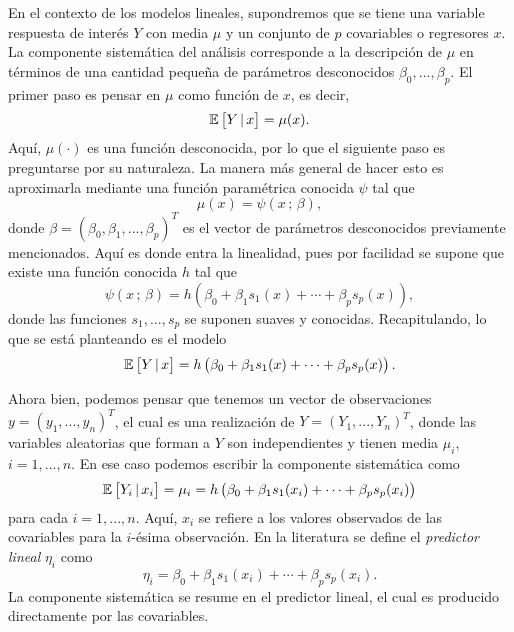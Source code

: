 En el contexto de los modelos lineales, supondremos que se tiene una variable respuesta  de interés $Y$ con media $\mu$ y un conjunto de $p$ covariables o regresores $x$. La componente sistemática del análisis corresponde a la descripción de $\mu$ en términos de una cantidad pequeña de parámetros desconocidos $\beta_0, ..., \beta_p$. El primer paso es pensar en $\mu$ como función de $x$, es decir,
\begin{equation*}
	\mathbb{E} \left[ Y \, | \, x \right] = \mu (x).
\end{equation*}
Aquí, $\mu(\cdot)$ es una función desconocida, por lo que el siguiente paso es preguntarse por su naturaleza. La manera más general de hacer esto es aproximarla mediante una función paramétrica conocida $\psi$ tal que
\begin{equation*}
	\mu (x) = \psi (x \, ; \, \beta),
\end{equation*}
donde $\beta = (\beta_0, \beta_1, ..., \beta_p)^T$ es el vector de parámetros desconocidos previamente mencionados. Aquí es donde entra la linealidad, pues por facilidad se supone que existe una función conocida $h$ tal que
\begin{equation} \label{eq:lm1}
	\psi (x \, ; \, \beta) = h \left(  \beta_0 + \beta_1 s_1(x) + \cdots + \beta_p s_p(x) \right),
\end{equation}
donde las funciones $s_1, ..., s_p$ se suponen suaves y conocidas. Recapitulando, lo que se está planteando es el modelo
\begin{equation} \label{eq:lm2}
	\mathbb{E} \left[ Y \, | \, x \right] = h \left(  \beta_0 + \beta_1 s_1(x) + \cdots + \beta_p s_p(x) \right).
\end{equation}

Ahora bien, podemos pensar que tenemos un vector de observaciones \newline$y = (y_1, ..., y_n)^T$, el cual es una realización de $Y = (Y_1, ..., Y_n)^T$, donde las variables aleatorias que forman a $Y$ son independientes y tienen media $\mu_i$, $i=1,...,n$. En ese caso podemos escribir la componente sistemática como
\begin{equation*}
	\mathbb{E} \left[ Y_i \, | \, x_i \right] = \mu_i = h \left(  \beta_0 + \beta_1 s_1(x_i) + \cdots + \beta_p s_p(x_i) \right)
\end{equation*}
para cada $i=1,...,n$. Aquí, $x_i$ se refiere a los valores observados de las covariables para la $i$-ésima observación. En la literatura se define el \textit{predictor lineal} $\eta_i$ como
\begin{equation*}
	\eta_i = \beta_0 + \beta_1 s_1(x_i) + \cdots + \beta_p s_p(x_i).
\end{equation*}
La componente sistemática se resume en el predictor lineal, el cual es producido directamente por las covariables. \\

